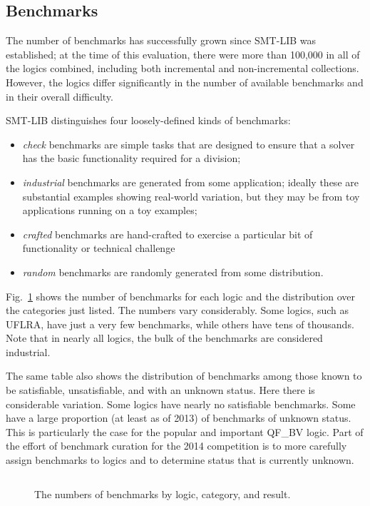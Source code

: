 \documentclass[smallcondensed]{svjour3}
\begin{document}
\subsection{Benchmarks}
\label{Benchmarks}

The number of benchmarks has successfully grown since SMT-LIB was established; at the time of this evaluation, there were more than 100,000 in all of the logics combined, including both incremental and non-incremental collections. However, the logics differ significantly in the number of available benchmarks and in their overall difficulty.

SMT-LIB distinguishes four loosely-defined kinds of benchmarks:
\begin{itemize}[noitemsep,nolistsep]
\item {\em check} benchmarks are simple tasks that are designed to ensure that a solver has the basic functionality required for a division;
\item {\em industrial} benchmarks are generated from some application; ideally these are substantial examples showing real-world variation, but they may be from toy applications running on a toy examples;
\item {\em crafted} benchmarks are hand-crafted to exercise a particular bit of functionality or technical challenge
\item {\em random} benchmarks are randomly generated from some distribution.
\end{itemize}
Fig.~\ref{Fig:category} shows the number of benchmarks for each logic and the distribution over the categories just listed. The numbers vary considerably. Some logics, such as UFLRA, have just a very few benchmarks, while others have tens of thousands. Note that in nearly all logics, the bulk of the benchmarks are 
considered industrial.

The same table also shows the distribution of benchmarks among those known to be satisfiable, unsatisfiable, and with an unknown status. Here there is 
considerable variation. Some logics have nearly no satisfiable benchmarks. Some have a large proportion (at least as of 2013) of benchmarks of unknown status.
This is particularly the case for the popular and important QF\_BV logic.
Part of the effort of benchmark curation for the 2014 competition is to more carefully assign benchmarks to logics and to determine status that is currently unknown.

\begin{figure}
\centering
\begin{tabular}{|l|r|p{.45in}p{.3in}p{.35in}p{.25in}|p{.25in}p{.25in}p{.4in}|}
\hline

\end{tabular}
\caption{The numbers of benchmarks by logic, category, and result.}
\label{Fig:category}
\end{figure}
\end{document}
